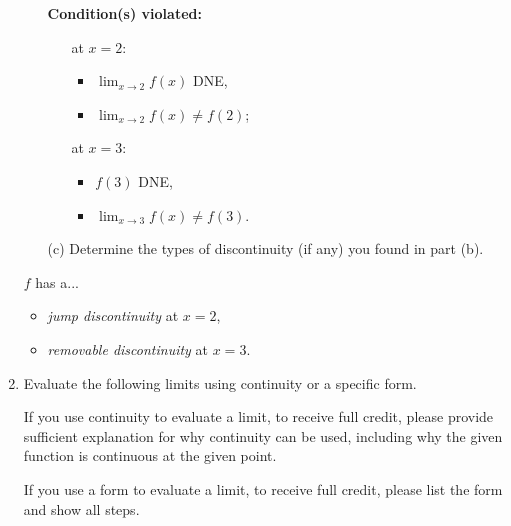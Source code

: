 \documentclass[11pt]{article}
\begin{document}
\begin{enumerate}
\begin{enumerate}
\begin{minipage}[t]{0.40\textwidth}
\textbf{Condition(s) violated:}\\
{\color{blue}
\begin{itemize}
\item[at $x=2$:]
\begin{itemize}
\item
$\displaystyle \lim_{x\to 2} f(x)$ DNE,
\item
$\displaystyle \lim_{x\to 2} f(x) \neq f(2)$;
\end{itemize}
\item[at $x=3$:]
\begin{itemize}
\item
$f(3)$ DNE,
\item
$\displaystyle \lim_{x\to 3} f(x) \neq f(3)$.
\end{itemize}
\end{itemize}}
\vfill
\end{minipage}
\vspace{5em}

    \item[(c)] Determine the types of discontinuity (if any) you found in part (b).
\end{enumerate}
{\color{blue}
$f$ has a...
\begin{itemize}
\item
\emph{jump discontinuity} at $x=2$,
\item
\emph{removable discontinuity} at $x=3$.
\end{itemize}}



\newpage


\item Evaluate the following limits using continuity or a specific form.

If you use continuity to evaluate a limit, to receive full credit, please provide sufficient explanation for why continuity can be used, including why the given function is continuous at the given point.

If you use a form to evaluate a limit, to receive full credit, please list the form and show all steps. 
\vspace{5em}


\end{enumerate}
\end{document}
